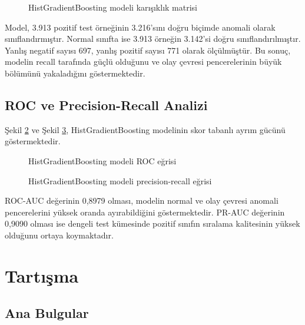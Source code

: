 \begin{figure}[htbp]
    \centering
    \caption{HistGradientBoosting modeli karışıklık matrisi}
    \label{fig:clean_confusion}
\end{figure}

Model, 3.913 pozitif test örneğinin 3.216'sını doğru biçimde anomali olarak sınıflandırmıştır. Normal sınıfta ise 3.913 örneğin 3.142'si doğru sınıflandırılmıştır. Yanlış negatif sayısı 697, yanlış pozitif sayısı 771 olarak ölçülmüştür. Bu sonuç, modelin recall tarafında güçlü olduğunu ve olay çevresi pencerelerinin büyük bölümünü yakaladığını göstermektedir.

\subsection{ROC ve Precision-Recall Analizi}

Şekil \ref{fig:clean_roc} ve Şekil \ref{fig:clean_pr}, HistGradientBoosting modelinin skor tabanlı ayrım gücünü göstermektedir.

\begin{figure}[htbp]
    \centering
    \caption{HistGradientBoosting modeli ROC eğrisi}
    \label{fig:clean_roc}
\end{figure}

\begin{figure}[htbp]
    \centering
    \caption{HistGradientBoosting modeli precision-recall eğrisi}
    \label{fig:clean_pr}
\end{figure}

ROC-AUC değerinin 0,8979 olması, modelin normal ve olay çevresi anomali pencerelerini yüksek oranda ayırabildiğini göstermektedir. PR-AUC değerinin 0,9090 olması ise dengeli test kümesinde pozitif sınıfın sıralama kalitesinin yüksek olduğunu ortaya koymaktadır.

\section{Tartışma}

\subsection{Ana Bulgular}


